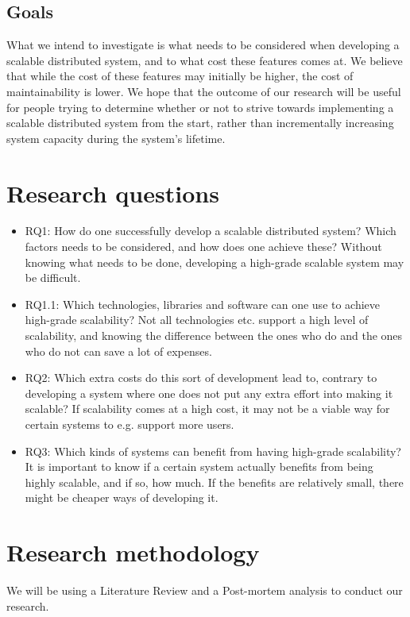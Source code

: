 \documentclass{article}
\begin{document}
\subsection{Goals} 
What we intend to investigate is what needs to be considered
when developing a scalable distributed system, and to what cost these features
comes at. We believe that while the cost of these features may initially be
higher, the cost of maintainability is lower. We hope that the outcome of our
research will be useful for people trying to determine whether or not to strive
towards implementing a scalable distributed system from the start, rather than
incrementally increasing system capacity during the system's lifetime.

\newpage

\section{Research questions}
\begin{itemize}
\item{RQ1: How do one successfully develop a scalable distributed system? Which
factors needs to be considered, and how does one achieve these? Without knowing
what needs to be done, developing a high-grade scalable system may be
difficult.} 

\item{RQ1.1: Which technologies, libraries and software can one use to achieve
high-grade scalability? Not all technologies etc. support a high level of
scalability, and knowing the difference between the ones who do and the ones
who do not can save a lot of expenses.}

\item{RQ2: Which extra costs do this sort of development lead to, contrary to
developing a system where one does not put any extra effort into making it
scalable? If scalability comes at a high cost, it may not be a viable way for
certain systems to e.g. support more users.} 

\item{RQ3: Which kinds of systems can benefit from having high-grade scalability? It
is important to know if a certain system actually benefits from being highly
scalable, and if so, how much. If the benefits are relatively small, there 
might be cheaper ways of developing it.}
\end{itemize}

\section{Research methodology}
We will be using a Literature Review and a Post-mortem analysis to conduct our 
research. 
\end{document}
